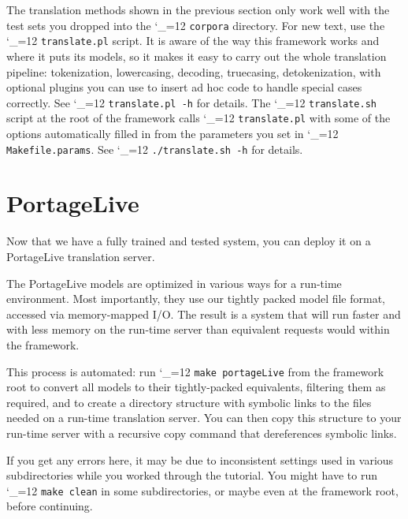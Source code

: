 \documentclass[11pt,letterpaper]{article}
\def\code{\begingroup\catcode`\_=12 \codex}
\newcommand{\codex}[1]{\texttt{#1}\endgroup}
\begin{document}
The translation methods shown in the previous section only work well with the test
sets you dropped into the \code{corpora} directory.
For new text, use the \code{translate.pl} script.
It is aware of the way this framework works and where it puts its
models, so it makes it easy to carry out the whole translation pipeline:
tokenization, lowercasing, decoding, truecasing, detokenization, with optional
plugins you can use to insert ad hoc code to handle special cases correctly.
See \code{translate.pl -h} for details.  The \code{translate.sh} script
at the root of the framework calls \code{translate.pl} with some of the options
automatically filled in from the parameters you set in \code{Makefile.params}.
See \code{./translate.sh -h} for details.

\section{PortageLive} \label{PLive}

Now that we have a fully trained and tested system, you can deploy it
on a PortageLive translation server.

The PortageLive models are optimized in various ways for a run-time
environment.  Most importantly, they use our tightly packed model file format,
accessed via memory-mapped I/O.
The result is a system that will run faster and with less memory on the
run-time server than equivalent requests would within the framework.

This process is automated:
run \code{make portageLive} from the framework
root to convert all models to
their tightly-packed equivalents,
filtering them as required, and to create a directory structure with symbolic
links to the files needed on a run-time translation server.  You can
then copy this structure to your run-time server with a recursive copy
command that dereferences symbolic links.

If you get any errors here, it may be due to inconsistent settings used in various subdirectories while you
worked through the tutorial.
You might have to run \code{make clean} in some subdirectories, or maybe even at the framework root,
before continuing.
\end{document}
